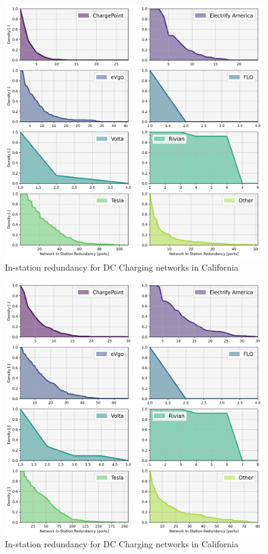 \documentclass[11pt]{article}
\begin{document}
\begin{multicols}{2}
\begin{figure}[H]
	\centering
	\includegraphics[width = \linewidth]{figs/California_RBS_300_SF_All.png}
	\caption{In-station redundancy for DC Charging networks in California}
	\label{fig:rbs_300_top_8_networks}
\end{figure}


\begin{figure}[H]
	\centering
	\includegraphics[width = \linewidth]{figs/California_RBS_600_SF_All.png}
	\caption{In-station redundancy for DC Charging networks in California}
	\label{fig:rbs_600_top_8_networks}
\end{figure}




\end{multicols}
\end{document}
